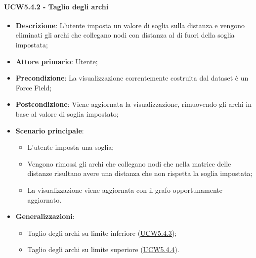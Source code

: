 \paragraph{UCW5.4.2 - Taglio degli archi}
\label{par:ucw5.4.2}
\begin{itemize}
    \item \textbf{Descrizione}:     L'utente imposta un valore di soglia sulla distanza e vengono eliminati gli archi che collegano nodi con distanza al di fuori della soglia impostata;
    \item \textbf{Attore primario}: Utente;
    \item \textbf{Precondizione}:   La visualizzazione correntemente costruita dal dataset è un Force Field;
    \item \textbf{Postcondizione}:  Viene aggiornata la visualizzazione, rimuovendo gli archi in base al valore di soglia impostato;
    \item \textbf{Scenario principale}:
    \begin{itemize}
        \item L'utente imposta una soglia;
        \item Vengono rimossi gli archi che collegano nodi che nella matrice delle distanze risultano avere una distanza che non rispetta la soglia impostata;
        \item La visualizzazione viene aggiornata con il grafo opportunamente aggiornato.
    \end{itemize}

    \item \textbf{Generalizzazioni}:
    \begin{itemize}
        \item Taglio degli archi su limite inferiore (\hyperref[par:ucw5.4.3]{UCW5.4.3});
        \item Taglio degli archi su limite superiore (\hyperref[par:ucw5.4.4]{UCW5.4.4}).
    \end{itemize}
\end{itemize}

